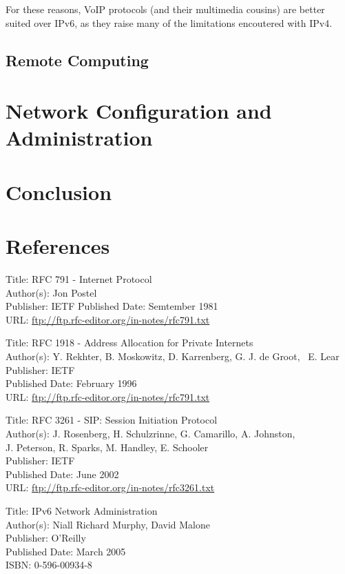 \documentclass[a4paper,12pt]{article}
\begin{document}
For these reasons, VoIP protocols (and their multimedia cousins) are
better suited over IPv6, as they raise many of the limitations
encoutered with IPv4. 

\subsection{Remote Computing}


\section{Network Configuration and Administration}


\section{Conclusion}


\section{References}

Title: RFC 791 - Internet Protocol \\
Author(s): Jon Postel \\
Publisher: IETF
Published Date: Semtember 1981 \\
URL: \url{ftp://ftp.rfc-editor.org/in-notes/rfc791.txt}	 

Title: RFC 1918 - Address Allocation for Private Internets \\
Author(s): Y. Rekhter, B. Moskowitz, D. Karrenberg, G. J. de Groot, \
\indent E. Lear \\
Publisher: IETF \\
Published Date: February 1996  \\
URL: \url{ftp://ftp.rfc-editor.org/in-notes/rfc791.txt}	 

Title: RFC 3261 - SIP: Session Initiation Protocol \\
Author(s): J. Rosenberg, H. Schulzrinne, G. Camarillo, A. Johnston, \\
\indent J. Peterson, R. Sparks, M. Handley, E. Schooler \\
Publisher: IETF \\
Published Date: June 2002  \\
URL: \url{ftp://ftp.rfc-editor.org/in-notes/rfc3261.txt}	 

Title: IPv6 Network Administration \\
Author(s): Niall Richard Murphy, David Malone \\
Publisher: O'Reilly \\
Published Date: March 2005  \\
ISBN: 0-596-00934-8	 
\end{document}
